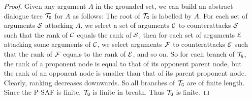 \begin{proof}
Given any argument $A$ in the grounded set, we can build an abstract dialogue tree $\mathcal{T}_{\texttt{\textup{G}}}$ for $A$ as follows: The root of $\mathcal{T}_{\texttt{\textup{G}}}$ is labelled by $A$. For each set of arguments $\mathcal{S}$ attacking $A$, we select a set of arguments $\mathcal{C}$ to counterattacks $\mathcal{S}$ such that the rank of $\mathcal{C}$ equals the rank of $\mathcal{S}$, then for each set of arguments $\mathcal{E}$ attacking some arguments of $\mathcal{C}$, we select arguments $\mathcal{F}$ to counterattacks $\mathcal{E}$ such that the rank of $\mathcal{F}$ equals to the rank of $\mathcal{E}$, and so on. So for each branch of $\mathcal{T}_{\texttt{\textup{G}}}$, the rank of a proponent node is equal to that of its opponent parent node, but the rank of an opponent node is smaller than that of its parent proponent node. Clearly, ranking decreases downwards. So all branches of $\mathcal{T}_{\texttt{\textup{G}}}$ are of finite length. Since the P-SAF is finite, $\mathcal{T}_{\texttt{\textup{G}}}$ is finite in breath. Thus  $\mathcal{T}_{\texttt{\textup{G}}}$ is finite.




    
\end{proof}


\thmground*

